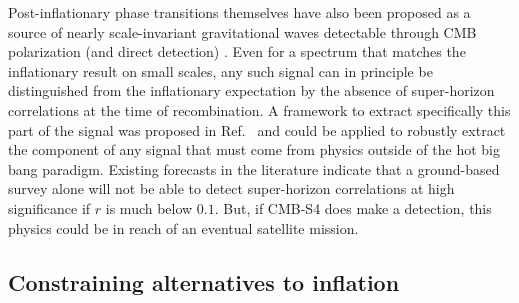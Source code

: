 Post-inflationary phase transitions themselves have also been proposed as a source of nearly scale-invariant gravitational waves detectable through CMB polarization (and direct detection) \cite{Krauss:1991qu,JonesSmith:2007ne,Giblin:2011yh,Figueroa:2012kw,Fenu:2013tea}. Even for a spectrum that matches the inflationary result on small scales, any such signal can in principle be distinguished from the inflationary expectation by the absence of super-horizon correlations at the time of recombination. A framework to extract specifically this part of the signal was proposed in Ref.~\cite{Baumann:2009mq} and could be applied to robustly extract the component of any signal that must come from physics outside of the hot big bang paradigm. Existing forecasts in the literature \cite{Lee:2014cya} indicate that a ground-based survey alone will not be able to detect super-horizon correlations at high significance if $r$ is much below $0.1$. But, if CMB-S4 does make a detection, this physics could be in reach of an eventual satellite mission.



\subsection{Constraining alternatives to inflation}
\label{subsec:alternatives}


